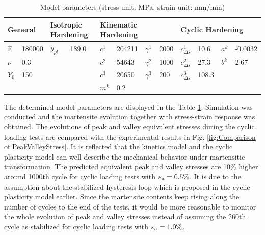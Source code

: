 \documentclass[final,5p,times,onecolumn,10pt,sort&compress]{elsarticle}
\begin{document}
\begin{table}[htbp]
\centering
\caption{Model parameters (stress unit: MPa, strain unit: mm/mm)}
\begin{tabular}{llllllllllll}
\hline
\multicolumn{2}{l}{General} & \multicolumn{2}{l}{Isotropic Hardening} & \multicolumn{4}{l}{Kinematic Hardening} & \multicolumn{4}{l}{Cyclic Hardening} \\ \hline
E               & 180000 & $y_{pt}$ & 189.0       & $c^{1}$  & 204211    & $\gamma^{1}$ & 2000      & $c_{\Delta s}^{1}$                  & 10.6 & $a^{k}$ & -0.0032 \\
$\nu$        & 0.3        &                 &                 & $c^{2}$  & 54643      & $\gamma^{2}$ & 1000      & $c_{\Delta s}^{2}$                  & 27.3 & $b^{k}$ & 2.67 \\
$Y_{0}$   & 150       &                 &                 & $c^{3}$  & 20650      & $\gamma^{3}$ & 200        & $c_{\Delta s}^{3}$                  & 108.3 \\
                 &              &                 &                 & $m^{k}$ &0.2            &                            &               &                                                   &      &              & \\ \hline
\end{tabular}
\label{tab:Model Parameters}
\end{table}

The determined model parameters are displayed in the Table \ref{tab:Model Parameters}.
Simulation was conducted and the martensite evolution together with stress-strain response was obtained. The evolutions of peak and valley equivalent stresses during the cyclic loading tests are compared with the experimental results in Fig. \ref{fig:Comparison of PeakValleyStress}. It is reflected that the kinetics model and the cyclic plasticity model can well describe the mechanical behavior under martensitic transformation. The predicted equivalent peak and valley stresses are 10\% higher around 1000th cycle for cyclic loading tests with $\varepsilon _{\rm a}=0.5\%$. It is due to the assumption about the stabilized hysteresis loop which is proposed in the cyclic plasticity model earlier. Since the martensite contents keep rising along the number of cycles to the end of the tests, it would be more reasonable to monitor the whole evolution of peak and valley stresses instead of assuming the 260th cycle as stabilized for cyclic loading tests with $\varepsilon _{\rm a}=1.0\%$.
\end{document}
